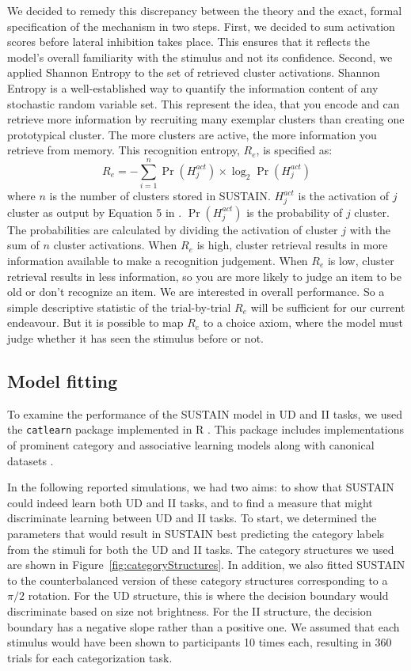 \documentclass[12pt]{article}
\begin{document}
We decided to remedy this discrepancy between the theory and the exact,
formal specification of the mechanism in two steps. First, we decided to
sum activation scores before lateral inhibition takes place. This ensures
that it reflects the model's overall familiarity with the stimulus and
not its confidence. Second, we applied Shannon Entropy to the set of 
retrieved cluster activations. Shannon Entropy is a well-established
way to quantify the information content of any stochastic random variable 
set. This represent the idea, that you encode and can retrieve more
information by recruiting many exemplar clusters than creating one prototypical
cluster. The more clusters are active, the more information you retrieve
from memory. This recognition entropy, $R_{e}$, is specified as:
\begin{equation}
R_{e} = -\sum^n_{i = 1}{\Pr(H^{act}_j) \times \log_2{\Pr(H^{act}_j)}}
\end{equation}
where $n$ is the number of clusters stored in SUSTAIN. $H^{act}_j$ is the 
activation of $j$ cluster as output by Equation 5 in .
$\Pr(H^{act}_j)$ is the probability of $j$ cluster. The probabilities
are calculated by dividing the activation of cluster $j$ with the sum of
$n$ cluster activations. When $R_e$ is high, cluster retrieval results in more
information available to make a recognition judgement. When $R_e$ is low,
cluster retrieval results in less information, so you are more likely to
judge an item to be old or don't recognize an item. We are interested in
overall performance. So a simple descriptive statistic of the trial-by-trial
$R_e$ will be sufficient for our current endeavour. But it is possible to map 
$R_e$ to a choice axiom, where the model must judge whether it has seen the
stimulus before or not.

\subsection{Model fitting}
To examine the performance of the SUSTAIN model in UD and II tasks, we used the \texttt{catlearn} package \cite{catlearn} implemented in R \cite{Rcore}. 
This package includes implementations of prominent category and associative learning models along with canonical datasets \cite{Wills:2017ez}. 

In the following reported simulations, we had two aims: to show that SUSTAIN could indeed learn both UD and II tasks, and to find a measure that might discriminate learning between UD and II tasks. 
To start, we determined the parameters that would result in SUSTAIN best predicting the category labels from the stimuli for both the UD and II tasks. 
The category structures we used are shown in Figure~\ref{fig:categoryStructures}.
In addition, we also fitted SUSTAIN to the counterbalanced version of these category structures corresponding to a $\pi/2$ rotation. 
For the UD structure, this is where the decision boundary would discriminate based on size not brightness. 
For the II structure, the decision boundary has a negative slope rather than a positive one. 
We assumed that each stimulus would have been shown to participants 10 times each, resulting in 360 trials for each categorization task. 
\end{document}
